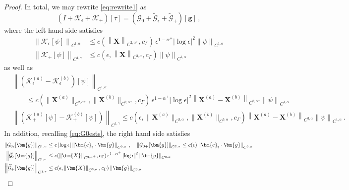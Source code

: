 \documentclass[11pt,reqno]{amsart}
\newcommand{\X}{\bm{X}}
\newcommand{\be}{\bm{e}}
\newcommand{\abs}[1]{\left\lvert #1 \right\rvert}
\newcommand{\norm}[1]{\left\lVert #1 \right\rVert}
\newcommand{\wt}[1]{\widetilde{#1}}
\newcommand{\mc}[1]{\mathcal{#1}}
\theoremstyle{definition}
\begin{document}
\begin{proof}
In total, we may rewrite \eqref{eq:rewrite1} as
\begin{equation}\label{eq:Keps_def}
  (I+ \mc{K}_\epsilon + \mc{K}_+)[\tau] = (\mc{G}_0+\wt{\mc{G}}_\epsilon+\wt{\mc{G}}_+)[\bm{g}]\,,
\end{equation}
where the left hand side satisfies
\begin{equation}\label{eq:Kbds1}
\begin{aligned}
  \norm{\mc{K}_\epsilon[\psi]}_{C^{1,\alpha}} &\le c(\norm{\X}_{C^{2,\alpha^+}},c_\Gamma)\,\epsilon^{1-\alpha^+}\abs{\log\epsilon}^2\norm{\psi}_{C^{1,\alpha}} \\
  \norm{\mc{K}_+[\psi]}_{C^{1,\gamma}} &\le c(\epsilon,\norm{\X}_{C^{3,\alpha}},c_\Gamma)\norm{\psi}_{C^{1,\alpha}}
\end{aligned}
\end{equation}
as well as 
\begin{equation}\label{eq:Kbds2}
\begin{aligned}
  &\norm{(\mc{K}_\epsilon^{(a)}-\mc{K}_\epsilon^{(b)})[\psi]}_{C^{1,\alpha}}\\ 
  &\qquad \le c(\|\X^{(a)}\|_{C^{2,\alpha^+}},\|\X^{(b)}\|_{C^{2,\alpha^+}},c_\Gamma)\,\epsilon^{1-\alpha^+}\abs{\log\epsilon}^2\norm{\X^{(a)}-\X^{(b)}}_{C^{2,\alpha^+}}\norm{\psi}_{C^{1,\alpha}} \\
  &\norm{(\mc{K}_+^{(a)}[\psi]-\mc{K}_+^{(b)}[\psi])}_{C^{1,\gamma}} \le c(\epsilon,\|\X^{(a)}\|_{C^{3,\alpha}},\|\X^{(b)}\|_{C^{3,\alpha}},c_\Gamma)\norm{\X^{(a)}-\X^{(b)}}_{C^{3,\alpha}}\norm{\psi}_{C^{1,\alpha}}\,.
\end{aligned}
\end{equation}
%
%
%
In addition, recalling \eqref{eq:G0ests}, the right hand side satisfies 
\begin{equation}\label{eq:Gests1}
\begin{aligned}
  \norm{\mc{G}_{0\epsilon}[\bm{g}]}_{C^{1,\alpha}}&\le c\abs{\log\epsilon}\norm{\be_{\rm t}\cdot\bm{g}}_{C^{0,\alpha}}\,, \quad 
  \norm{\mc{G}_{0+}[\bm{g}]}_{C^{2,\alpha}}\le c(\epsilon)\norm{\be_{\rm t}\cdot\bm{g}}_{C^{0,\alpha}}
  \\
  \norm{\wt{\mc{G}}_\epsilon[\bm{g}]}_{C^{1,\alpha}}&\le c(\|\X\|_{C^{2,\alpha^+}},c_\Gamma)\,\epsilon^{1-\alpha^+}\abs{\log\epsilon}^2\norm{\bm{g}}_{C^{0,\alpha}}\\
  \norm{\wt{\mc{G}}_+[\bm{g}]}_{C^{1,\gamma}}&\le c(\epsilon,\norm{\X}_{C^{3,\alpha}},c_\Gamma)\norm{\bm{g}}_{C^{0,\alpha}}
\end{aligned}
\end{equation}

\end{proof}
\end{document}
